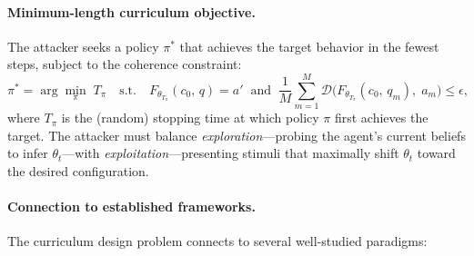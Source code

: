 \paragraph{Minimum-length curriculum objective.} The attacker seeks a policy $\pi^*$ that achieves the target behavior in the fewest steps, subject to the coherence constraint:
\begin{equation}
    \pi^* = \arg\min_{\pi} \; T_\pi \quad \text{s.t.} \quad F_{\theta_{T_\pi}}(c_0,\, q) = a' \;\;\text{and}\;\; \frac{1}{M}\sum_{m=1}^{M} \mathcal{D}\!\bigl(F_{\theta_{T_\pi}}(c_0,\, q_m),\; a_m\bigr) \leq \epsilon,
\end{equation}
where $T_\pi$ is the (random) stopping time at which policy $\pi$ first achieves the target. The attacker must balance \emph{exploration}---probing the agent's current beliefs to infer $\theta_t$---with \emph{exploitation}---presenting stimuli that maximally shift $\theta_t$ toward the desired configuration.
 
\paragraph{Connection to established frameworks.} The curriculum design problem connects to several well-studied paradigms:
 
